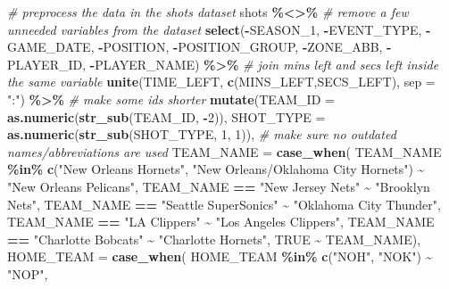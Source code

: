 \documentclass[
  12pt,
  a4paper,
]{article}
\newenvironment{Shaded}{\begin{snugshade}}{\end{snugshade}}
\newcommand{\AttributeTok}[1]{\textcolor[rgb]{0.13,0.29,0.53}{#1}}
\newcommand{\CommentTok}[1]{\textcolor[rgb]{0.56,0.35,0.01}{\textit{#1}}}
\newcommand{\ConstantTok}[1]{\textcolor[rgb]{0.56,0.35,0.01}{#1}}
\newcommand{\DecValTok}[1]{\textcolor[rgb]{0.00,0.00,0.81}{#1}}
\newcommand{\FunctionTok}[1]{\textcolor[rgb]{0.13,0.29,0.53}{\textbf{#1}}}
\newcommand{\NormalTok}[1]{#1}
\newcommand{\SpecialCharTok}[1]{\textcolor[rgb]{0.81,0.36,0.00}{\textbf{#1}}}
\newcommand{\StringTok}[1]{\textcolor[rgb]{0.31,0.60,0.02}{#1}}
\begin{document}
\begin{Shaded}
\begin{Highlighting}[]
\CommentTok{\# preprocess the data in the shots dataset}
\NormalTok{shots }\SpecialCharTok{\%\textless{}\textgreater{}\%}
  \CommentTok{\# remove a few unneeded variables from the dataset}
  \FunctionTok{select}\NormalTok{(}\SpecialCharTok{{-}}\NormalTok{SEASON\_1, }\SpecialCharTok{{-}}\NormalTok{EVENT\_TYPE, }\SpecialCharTok{{-}}\NormalTok{GAME\_DATE,}
         \SpecialCharTok{{-}}\NormalTok{POSITION, }\SpecialCharTok{{-}}\NormalTok{POSITION\_GROUP, }\SpecialCharTok{{-}}\NormalTok{ZONE\_ABB,}
         \SpecialCharTok{{-}}\NormalTok{PLAYER\_ID, }\SpecialCharTok{{-}}\NormalTok{PLAYER\_NAME) }\SpecialCharTok{\%\textgreater{}\%}
  \CommentTok{\# join mins left and secs left inside the same variable}
  \FunctionTok{unite}\NormalTok{(TIME\_LEFT, }\FunctionTok{c}\NormalTok{(MINS\_LEFT,SECS\_LEFT), }\AttributeTok{sep =} \StringTok{":"}\NormalTok{) }\SpecialCharTok{\%\textgreater{}\%}
  \CommentTok{\# make some ids shorter}
  \FunctionTok{mutate}\NormalTok{(}\AttributeTok{TEAM\_ID    =} \FunctionTok{as.numeric}\NormalTok{(}\FunctionTok{str\_sub}\NormalTok{(TEAM\_ID, }\SpecialCharTok{{-}}\DecValTok{2}\NormalTok{)),}
         \AttributeTok{SHOT\_TYPE  =} \FunctionTok{as.numeric}\NormalTok{(}\FunctionTok{str\_sub}\NormalTok{(SHOT\_TYPE, }\DecValTok{1}\NormalTok{, }\DecValTok{1}\NormalTok{)),}
         \CommentTok{\# make sure no outdated names/abbreviations are used}
         \AttributeTok{TEAM\_NAME  =} \FunctionTok{case\_when}\NormalTok{(}
\NormalTok{         TEAM\_NAME }\SpecialCharTok{\%in\%} \FunctionTok{c}\NormalTok{(}\StringTok{"New Orleans Hornets"}\NormalTok{,}
                          \StringTok{"New Orleans/Oklahoma City Hornets"}\NormalTok{)}
                          \SpecialCharTok{\textasciitilde{}} \StringTok{"New Orleans Pelicans"}\NormalTok{,}
\NormalTok{         TEAM\_NAME }\SpecialCharTok{==} \StringTok{"New Jersey Nets"} \SpecialCharTok{\textasciitilde{}} \StringTok{"Brooklyn Nets"}\NormalTok{,}
\NormalTok{         TEAM\_NAME }\SpecialCharTok{==} \StringTok{"Seattle SuperSonics"} \SpecialCharTok{\textasciitilde{}} \StringTok{"Oklahoma City Thunder"}\NormalTok{,}
\NormalTok{         TEAM\_NAME }\SpecialCharTok{==} \StringTok{"LA Clippers"} \SpecialCharTok{\textasciitilde{}} \StringTok{"Los Angeles Clippers"}\NormalTok{,}
\NormalTok{         TEAM\_NAME }\SpecialCharTok{==} \StringTok{"Charlotte Bobcats"} \SpecialCharTok{\textasciitilde{}} \StringTok{"Charlotte Hornets"}\NormalTok{,}
         \ConstantTok{TRUE} \SpecialCharTok{\textasciitilde{}}\NormalTok{ TEAM\_NAME),}
         \AttributeTok{HOME\_TEAM  =} \FunctionTok{case\_when}\NormalTok{(}
\NormalTok{         HOME\_TEAM }\SpecialCharTok{\%in\%} \FunctionTok{c}\NormalTok{(}\StringTok{"NOH"}\NormalTok{, }\StringTok{"NOK"}\NormalTok{) }\SpecialCharTok{\textasciitilde{}} \StringTok{"NOP"}\NormalTok{,}

\end{Highlighting}
\end{Shaded}
\end{document}
